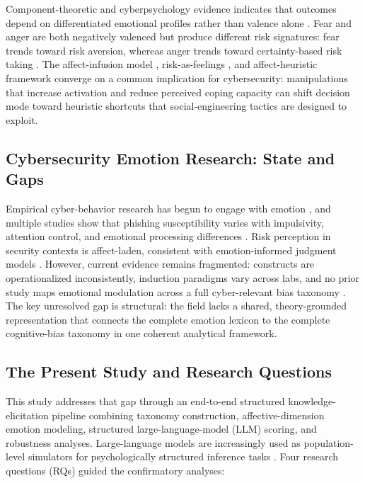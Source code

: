 \documentclass[12pt,a4paper]{article}
\begin{document}
Component-theoretic and cyberpsychology evidence indicates that outcomes depend on differentiated emotional profiles rather than valence alone \citep{lazarus1984stress, smith1985patterns, lerner2000beyond, renaud2021emotions}. Fear and anger are both negatively valenced but produce different risk signatures: fear trends toward risk aversion, whereas anger trends toward certainty-based risk taking \citep{lerner2000beyond, lerner2015emotion}. The affect-infusion model \citep{forgas1995mood}, risk-as-feelings \citep{loewenstein2001risk}, and affect-heuristic framework \citep{slovic2007affect} converge on a common implication for cybersecurity: manipulations that increase activation and reduce perceived coping capacity can shift decision mode toward heuristic shortcuts that social-engineering tactics are designed to exploit.

\subsection{Cybersecurity Emotion Research: State and Gaps}

Empirical cyber-behavior research has begun to engage with emotion \citep{renaud2021emotions, vanSchaik2020risk}, and multiple studies show that phishing susceptibility varies with impulsivity, attention control, and emotional processing differences \citep{vishwanath2011people, buckley2023employee, frank2022contextual, beltz2025gambit}. Risk perception in security contexts is affect-laden, consistent with emotion-informed judgment models \citep{vanSchaik2020risk}. However, current evidence remains fragmented: constructs are operationalized inconsistently, induction paradigms vary across labs, and no prior study maps emotional modulation across a full cyber-relevant bias taxonomy \citep{alsharida2023human, althobaiti2024phishing, renaud2021emotions}. The key unresolved gap is structural: the field lacks a shared, theory-grounded representation that connects the complete emotion lexicon to the complete cognitive-bias taxonomy in one coherent analytical framework.

\subsection{The Present Study and Research Questions}

This study addresses that gap through an end-to-end structured knowledge-elicitation pipeline combining taxonomy construction, affective-dimension emotion modeling, structured large-language-model (\textsc{LLM}) scoring, and robustness analyses. Large-language models are increasingly used as population-level simulators for psychologically structured inference tasks \citep{argyle2023out, grossmann2023ai}. Four research questions (RQs) guided the confirmatory analyses:
\end{document}
